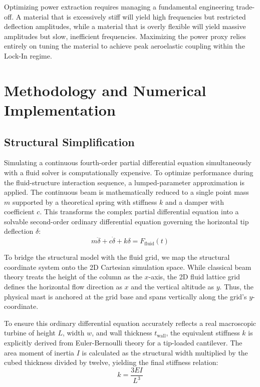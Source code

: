 \documentclass[11pt,a4paper]{article}
\begin{document}
Optimizing power extraction requires managing a fundamental engineering trade-off. A material that is excessively stiff will yield high frequencies but restricted deflection amplitudes, while a material that is overly flexible will yield massive amplitudes but slow, inefficient frequencies. Maximizing the power proxy relies entirely on tuning the material to achieve peak aeroelastic coupling within the Lock-In regime.

\section{Methodology and Numerical Implementation}
\label{sec:methodology}

\subsection{Structural Simplification}
Simulating a continuous fourth-order partial differential equation simultaneously with a fluid solver is computationally expensive. To optimize performance during the fluid-structure interaction sequence, a lumped-parameter approximation is applied. The continuous beam is mathematically reduced to a single point mass $m$ supported by a theoretical spring with stiffness $k$ and a damper with coefficient $c$. This transforms the complex partial differential equation into a solvable second-order ordinary differential equation governing the horizontal tip deflection $\delta$:
\begin{equation}
m\ddot{\delta} + c\dot{\delta} + k\delta = F_{\text{fluid}}(t)
\end{equation}

To bridge the structural model with the fluid grid, we map the structural coordinate system onto the 2D Cartesian simulation space. While classical beam theory treats the height of the column as the $x$-axis, the 2D fluid lattice grid defines the horizontal flow direction as $x$ and the vertical altitude as $y$. Thus, the physical mast is anchored at the grid base and spans vertically along the grid's $y$-coordinate.

To ensure this ordinary differential equation accurately reflects a real macroscopic turbine of height $L$, width $w$, and wall thickness $t_{\text{wall}}$, the equivalent stiffness $k$ is explicitly derived from Euler-Bernoulli theory for a tip-loaded cantilever. The area moment of inertia $I$ is calculated as the structural width multiplied by the cubed thickness divided by twelve, yielding the final stiffness relation:
\begin{equation}
k = \frac{3EI}{L^3}
\end{equation}
\end{document}
